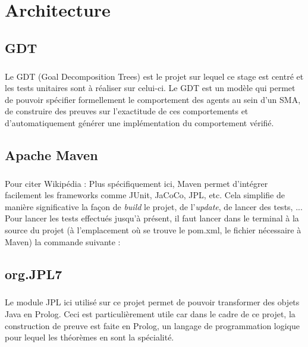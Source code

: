 \chapter{Architecture}

\section{GDT}
\paragraph{}
Le GDT (Goal Decomposition Trees) est le projet sur lequel ce stage est centré et les tests unitaires sont à réaliser sur celui-ci. Le GDT est un modèle qui permet de pouvoir spécifier formellement le comportement des agents au sein d'un SMA, de construire des preuves sur l'exactitude de ces comportements et d'automatiquement générer une implémentation du comportement vérifié.

\section{Apache Maven}\label{Maven}
\paragraph{}
Pour citer Wikipédia :
Plus spécifiquement ici, Maven permet d'intégrer facilement les frameworks comme JUnit, JaCoCo, JPL, etc. Cela simplifie de manière significative la façon de \textit{build} le projet, de l'\textit{update}, de lancer des tests, ...
Pour lancer les tests effectués jusqu'à présent, il faut lancer dans le terminal à la source du projet (à l'emplacement où se trouve le pom.xml, le fichier nécessaire à Maven) la commande suivante :

\section{org.JPL7}
\paragraph{}
Le module JPL ici utilisé sur ce projet permet de pouvoir transformer des objets Java en Prolog. Ceci est particulièrement utile car dans le cadre de ce projet, la construction de preuve est faite en Prolog, un langage de programmation logique pour lequel les théorèmes en sont la spécialité.

